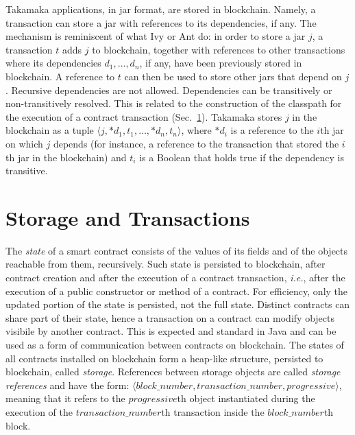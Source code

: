 \documentclass[10pt]{llncs}
\newcommand*{\ie}{\textit{i.e.}, }
\begin{document}
Takamaka applications, in jar format, are stored in blockchain. Namely, a
transaction can store a jar with references to its dependencies, if any.
The mechanism is reminiscent of what Ivy or Ant do:
in order to store a jar $j$, a transaction $t$ adds $j$ to
blockchain, together with references to other transactions where
its dependencies $d_1,\ldots,d_n$, if any, have been previously
stored in blockchain. A reference to $t$ can
then be used to store other jars that depend on $j$. Recursive dependencies
are not allowed. Dependencies can be transitively or
non-transitively resolved. This is related to the construction of the classpath
for the execution of a contract transaction (Sec.~\ref{sec:storage}).
Takamaka stores $j$ in the blockchain as a tuple
$\langle j,*d_1,t_1,\ldots,*d_n,t_n\rangle$,
where $*d_i$ is a reference to the $i$th jar on which $j$ depends
(for instance, a reference to the transaction that stored the
$i$th jar in the blockchain) and $t_i$ is
a Boolean that holds true if the dependency is transitive.

\section{Storage and Transactions}\label{sec:storage}

The \emph{state} of a smart contract consists of the values of its fields
and of the objects reachable from them, recursively.
Such state is persisted to blockchain, after contract creation and after
the execution of a contract transaction, \ie
after the execution of a public constructor or method of a contract.
For efficiency, only the updated
portion of the state is persisted, not the full state.
Distinct contracts can share
part of their state, hence a transaction on a contract can modify
objects visibile by another contract. This is expected and standard in Java
and can be used as a form of communication between contracts on blockchain.
The states of all contracts installed on blockchain form a
heap-like structure, persisted to blockchain, called \emph{storage}.
References between storage objects are called \emph{storage references} and
have the form:
%
$\langle\mathit{block\_number},\mathit{transaction\_number},\mathit{progressive}\rangle$,
%
meaning that it refers to the $\mathit{progressive}$th object instantiated during the
execution of the $\mathit{transaction\_number}$th transaction inside the
$\mathit{block\_number}$th block.
\end{document}

